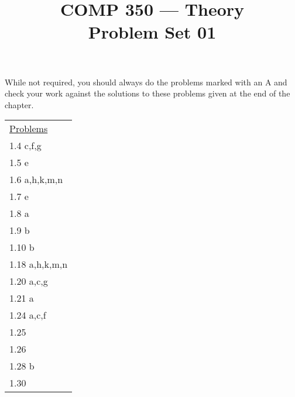 \documentclass[nobib]{tufte-handout}
\title{COMP 350 --- Theory \\ Problem Set 01}
\begin{document}
\maketitle

While not required, you should always do the problems marked with an A and check your work against the solutions to these problems given at the end of the chapter.

\begin{center}
\begin{tabular}{l}
  \underline{Problems} \\
  1.4 c,f,g \\
  1.5 e \\
  1.6 a,h,k,m,n \\
  1.7 e \\
  1.8 a \\
  1.9 b \\
  1.10 b \\
  1.18 a,h,k,m,n \\
  1.20 a,c,g  \\
  1.21 a \\
  1.24 a,c,f \\
  1.25 \\
  1.26 \\
  1.28 b \\
  1.30
\end{tabular}
\end{center}
\end{document}
